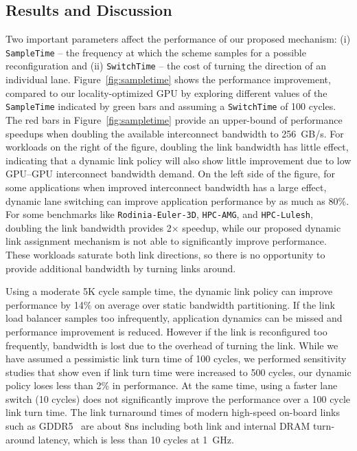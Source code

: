\subsection{Results and Discussion} 

Two important parameters affect the performance of
our proposed mechanism: (i)
\texttt{SampleTime} -- the frequency at which the scheme samples for a possible
reconfiguration and (ii) \texttt{SwitchTime} -- the cost of turning the
direction of an individual lane. Figure~\ref{fig:sampletime} shows the 
performance improvement, compared to our locality-optimized GPU by exploring different values of the
\texttt{SampleTime} indicated by green bars and assuming a \texttt{SwitchTime}
of 100 cycles. The red bars in Figure~\ref{fig:sampletime} provide an
upper-bound of performance speedups when doubling the available interconnect
bandwidth to \SI{256}{GB/s}. For workloads on the right of the figure, doubling the link
bandwidth has little effect, indicating that a dynamic link policy will also show little
improvement due to low GPU--GPU interconnect bandwidth demand.
On the left side of the figure, for some
applications when improved interconnect bandwidth has a large effect,
dynamic lane switching can improve application performance by as much as 80\%.
For some benchmarks like \texttt{Rodinia-Euler-3D}, \texttt{HPC-AMG}, and 
\texttt{HPC-Lulesh}, doubling the link bandwidth provides 2$\times$ 
speedup, while our proposed dynamic link assignment mechanism is not 
able to significantly improve performance. These workloads 
saturate both link directions, so there is no opportunity to 
provide additional bandwidth by turning links around.

Using a moderate 5K cycle sample time, the dynamic link policy can improve performance
by 14\% on average over static bandwidth partitioning. If the link load
balancer samples too infrequently, application dynamics can be missed
and performance improvement is reduced. However if the link is reconfigured
too frequently, bandwidth is lost due to the overhead of turning the link.
While we have assumed a pessimistic link turn time of 100 cycles, we performed
sensitivity studies that show even if link turn time were increased to 500
cycles, our dynamic policy loses less than 2\% in performance. 
At the same time, using a faster lane switch (10 cycles) does not
significantly improve the performance over a 100 cycle link turn time.
The link
turnaround times of modern high-speed on-board links such as
GDDR5~\cite{hynixgddr51Gb} are about 8ns including both link and internal 
DRAM turn-around latency, which is less than 10 cycles at \SI{1}{GHz}.

